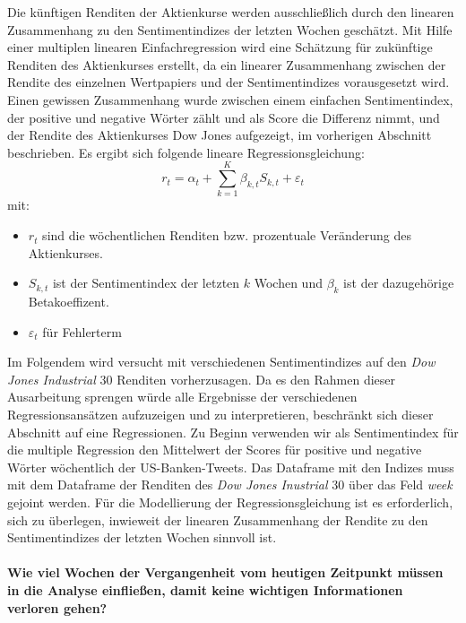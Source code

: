 Die künftigen Renditen der Aktienkurse werden ausschließlich
durch den linearen Zusammenhang zu den Sentimentindizes der letzten Wochen geschätzt. Mit Hilfe einer multiplen linearen Einfachregression wird eine Schätzung für zukünftige Renditen des Aktienkurses erstellt, da ein linearer Zusammenhang zwischen der Rendite des einzelnen Wertpapiers und der Sentimentindizes vorausgesetzt wird. Einen gewissen Zusammenhang wurde zwischen einem einfachen Sentimentindex, der positive und negative Wörter zählt und als Score die Differenz nimmt, und der Rendite des Aktienkurses  Dow Jones aufgezeigt, im  vorherigen Abschnitt beschrieben. Es ergibt sich folgende lineare Regressionsgleichung:
\begin{equation}
r_{t}=\alpha_{t}+ \sum_{k=1}^{K} \beta_{k,t} S_{k,t}+\varepsilon_{t}
\end{equation}
mit:
\begin{itemize}
	\item  $r_{t}$ sind die wöchentlichen Renditen bzw. prozentuale Veränderung des Aktienkurses.
	\item $S_{k,t}$ ist der Sentimentindex der letzten $k$ Wochen und $\beta_{k}$ ist der dazugehörige Betakoeffizent.
	\item $\varepsilon_{t}$ für  Fehlerterm 
\end{itemize}
Im Folgendem wird versucht mit verschiedenen Sentimentindizes auf den \textit{Dow Jones Industrial} $30$ Renditen vorherzusagen. Da es den Rahmen dieser Ausarbeitung sprengen würde alle Ergebnisse der verschiedenen Regressionsansätzen aufzuzeigen und zu interpretieren, beschränkt sich dieser Abschnitt auf eine Regressionen. Zu Beginn verwenden wir als Sentimentindex für die multiple Regression den Mittelwert der Scores für positive und negative Wörter wöchentlich der US-Banken-Tweets. Das Dataframe mit den Indizes muss mit dem Dataframe der Renditen des \textit{Dow Jones Inustrial} $30$  über das Feld \textit{week} gejoint werden. Für die Modellierung der Regressionsgleichung ist es erforderlich, sich zu überlegen, inwieweit der linearen Zusammenhang der Rendite zu den Sentimentindizes der letzten Wochen sinnvoll ist.\\
\\
\textbf{Wie viel Wochen der Vergangenheit vom heutigen Zeitpunkt müssen in die Analyse einfließen, damit keine wichtigen Informationen verloren gehen?} 
\\
\\
